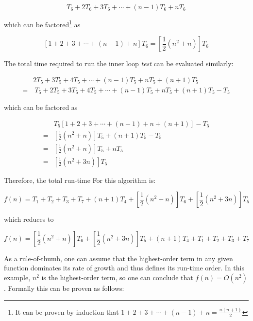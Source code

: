 \documentclass[12pt]{book} %
\begin{document}
\[
T_6 + 2T_6 + 3T_6 + \cdots + (n-1) T_6 + n T_6
\]

which can be factored\footnote{It can be proven by induction that $1 + 2 + 3 + \cdots + (n-1) + n = \frac{n(n+1)}{2}$} as

\[
\left[ 1 + 2 + 3 + \cdots + (n-1) + n \right] T_6 = \left[ \frac{1}{2} (n^2 + n) \right] T_6
\]

The total time required to run the inner loop \emph{test} can be evaluated similarly:

\begin{align}
& 2T_5 + 3T_5 + 4T_5 + \cdots + (n-1) T_5 + n T_5 + (n + 1) T_5\\
=&\ T_5 + 2T_5 + 3T_5 + 4T_5 + \cdots + (n-1)T_5 + nT_5 + (n+1)T_5 - T_5
\end{align}

which can be factored as

\begin{align}
& T_5 \left[ 1+2+3+\cdots + (n-1) + n + (n + 1) \right] - T_5 \\
=& \left[ \frac{1}{2} (n^2 + n) \right] T_5 + (n + 1)T_5 - T_5 \\
=& \left[ \frac{1}{2} (n^2 + n) \right] T_5 + n T_5 \\
=& \left[ \frac{1}{2} (n^2 + 3n) \right] T_5
\end{align}

Therefore, the total run-time For this algorithm is:

\[
f(n) = T_1 + T_2 + T_3 + T_7 + (n + 1)T_4 + \left[ \frac{1}{2} (n^2 + n) \right] T_6 + \left[ \frac{1}{2} (n^2+3n) \right] T_5
\]

which reduces to

\[
f(n) = \left[ \frac{1}{2} (n^2 + n) \right] T_6 + \left[ \frac{1}{2} (n^2 + 3n) \right] T_5 + (n + 1)T_4 + T_1 + T_2 + T_3 + T_7
\]

As a rule-of-thumb, one can assume that the highest-order term in any given function dominates its rate of growth and thus defines its run-time order.  In this example, $n^2$ is the highest-order term, so one can conclude that $f(n) = O(n^2)$.  Formally this can be proven as follows:
\end{document}

